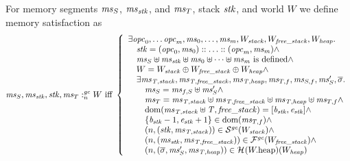 \begin{jversion}
\begin{definition}
  For memory segments $\mathit{ms}_S$, $\mathit{ms}_{\mathit{stk}}$, and $\mathit{ms}_T$, stack $\mathit{stk}$, and world $W$ we define memory satisfaction as
\[
  \mathit{ms}_S,\mathit{ms}_{\mathit{stk}},\mathit{stk},\mathit{ms}_T :_{n}^{\mathit{gc}}W \text{ iff } 
  \left\{
    \begin{array}{l}
      \exists \mathit{opc}_0, \dots \mathit{opc}_m, \mathit{ms}_0, \dots, \mathit{ms}_m, W_{\mathit{stack}}, W_{\mathit{free\_stack}}, W_{\mathit{heap}} \ldotp\\
      \quad \mathit{stk} = (\mathit{opc}_0,\mathit{ms}_0):: \dots :: (\mathit{opc}_m,\mathit{ms}_m) \wedge \\
      \quad \mathit{ms}_S \uplus \mathit{ms}_{\mathit{stk}} \uplus \mathit{ms}_0 \uplus \dots \uplus \mathit{ms}_m  \text{ is defined} \wedge\\
      \quad W = W_{\mathit{stack}} \oplus W_{\mathit{free\_stack}} \oplus W_{\mathit{heap}} \wedge\\
      \quad\exists \mathit{ms}_{\mathit{T,stack}}, \mathit{ms}_{\mathit{T,free\_stack}}, \mathit{ms}_{\mathit{T,heap}}, \mathit{ms}_{T,f}, \mathit{ms}_{S,f}, \mathit{ms}_S',\overline{\sigma}\ldotp \\
      \qquad \mathit{ms}_S = \mathit{ms}_{f,S} \uplus \mathit{ms}_S' \wedge \\
      \qquad \mathit{ms}_T = \mathit{ms}_{\mathit{T,stack}} \uplus \mathit{ms}_{\mathit{T,free\_stack}} \uplus \mathit{ms}_{\mathit{T,heap}} \uplus \mathit{ms}_{T,f} \wedge \\
      \qquad \mathrm{dom}(\mathit{ms}_{\mathit{T,stack}} \uplus \mathit{T,free\_stack}) = [\mathit{b}_{\mathit{stk}},\mathit{e}_{\mathit{stk}}] \wedge \\
      \qquad \{\mathit{b}_{\mathit{stk}} -1,\mathit{e}_{\mathit{stk}} + 1\} \in \mathrm{dom}(\mathit{ms}_{T,f}) \wedge \\
      \qquad \left(n,(\mathit{stk},\mathit{ms}_{\mathit{T,stack}})\right) \in \mathcal{S}^{\mathit{gc}}(W_{\mathit{stack}}) \wedge \\
      \qquad \left(n,(\mathit{ms}_{\mathit{stk}},\mathit{ms}_{\mathit{T,free\_stack}})\right) \in \mathcal{F}^{\mathit{gc}}(W_{\mathit{free\_stack}}) \wedge \\
      \qquad \left(n,(\overline{\sigma},\mathit{ms}_S',\mathit{ms}_{\mathit{T,heap}})\right) \in \mathcal{H}^{}(W.\mathrm{heap})(W_{\mathit{heap}})
    \end{array}
  \right.
\]
\end{definition}

\end{jversion}

